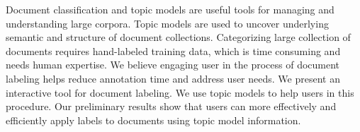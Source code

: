 Document classification and topic models are useful tools for managing and understanding large corpora. Topic models are used to uncover underlying semantic and structure of document collections. Categorizing large collection of documents requires hand-labeled training data, which is time consuming and needs human expertise. We believe engaging user in the process of document labeling helps reduce annotation time and address user needs. We present an interactive tool for document labeling. We use topic models to help users in this procedure. Our preliminary results show that users can more effectively and efficiently apply labels to documents using topic model information.
